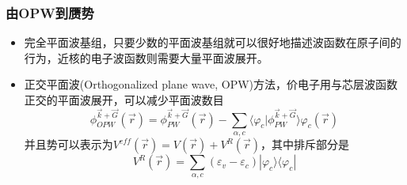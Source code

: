 \documentclass[cjk,slidestop,compress,mathserif,blue]{beamer}
\begin{document}

\frame
{
\frametitle{由OPW到赝势}
\begin{itemize}
\setlength{\itemsep}{5pt}
	\item 完全平面波基组，只要少数的平面波基组就可以很好地描述波函数在原子间的行为，近核的电子波函数则需要大量平面波展开。%
	\item 正交平面波(\textrm{Orthogonalized plane wave, OPW})方法，价电子用与芯层波函数正交的平面波展开，可以减少平面波数目
		\begin{displaymath}
			\phi_{OPW}^{\vec k+\vec G}(\vec r)=\phi_{PW}^{\vec k+\vec G}(\vec r)-\sum_{\alpha,c}\langle\varphi_c|\phi_{PW}^{\vec k+\vec G}\rangle\varphi_c(\vec r)
		\end{displaymath}
		并且势可以表示为$V^{eff}(\vec r)=V(\vec r)+V^R(\vec r)$，其中排斥部分是$$V^R(\vec r)=\sum_{\alpha,c}(\varepsilon_v-\varepsilon_c)|\varphi_c\rangle\langle\varphi_c|$$
\end{itemize}
}
\end{document}
